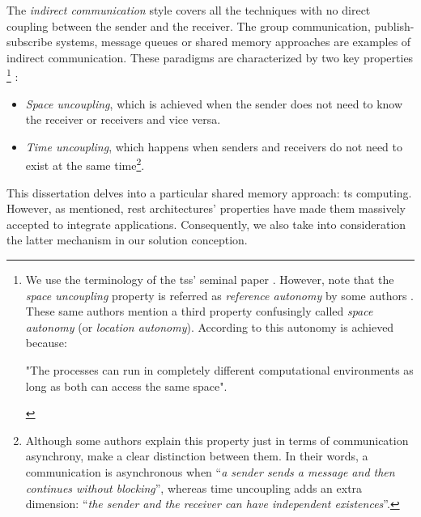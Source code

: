 \medskip


The \emph{indirect communication} style covers all the techniques with no direct coupling between the sender and the receiver.
The group communication, publish-subscribe systems, message queues or shared memory approaches are examples of indirect communication.
These paradigms are characterized by two key properties \citep{gelernter_generative_1985,coulouris_distributed_2012}
\footnote{
  We use the terminology of the  \aclp{ts}' seminal paper \citep{gelernter_generative_1985}. %
  However, note that
  the \emph{space uncoupling} property is referred as \emph{reference autonomy} by some authors \citep{fensel_triple-space_2004}. %
  These same authors mention a third property confusingly called \emph{space autonomy} (or \emph{location autonomy}).
  According to \citet{fensel_triple-space_2004} this autonomy is achieved because:
  \begin{emph} %
  "The processes can run in completely different computational environments as long as both can access the same space".
  \end{emph}
}
:

\begin{itemize}
 \item \emph{Space uncoupling}, which is achieved when the sender does not need to know the receiver or receivers and vice versa.
 \item \emph{Time uncoupling}, which happens when senders and receivers do not need to exist at the same time\footnote{
	  Although some authors \citep{fensel_triple-space_2004,krummenacher_www_2005} explain this property just in terms of communication asynchrony,
	  \citet{coulouris_distributed_2012} make a clear distinction between them.
	  In their words, a communication is asynchronous when ``\emph{a sender sends a message and then continues without blocking}'',
	  whereas time uncoupling adds an extra dimension: ``\emph{the sender and the receiver can have independent existences}''.
	  }.
\end{itemize}



This dissertation delves into a particular shared memory approach: \acl{ts} computing. %
However, as mentioned, \ac{rest} architectures' properties have made them massively accepted to integrate applications.
Consequently, we also take into consideration the latter mechanism in our solution conception.